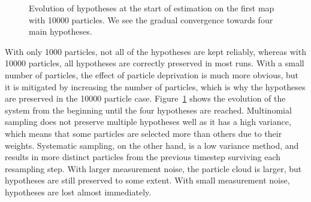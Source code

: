 \documentclass[a4paper,12pt]{article}
\begin{document}
\begin{figure}
  \caption{Evolution of hypotheses at the start of estimation on the first map
    with 10000 particles. We see the gradual convergence towards four main
    hypotheses.}
  \label{fig:hypev}
\end{figure}
With only 1000 particles, not all of the hypotheses are kept reliably, whereas
with 10000 particles, all hypotheses are correctly preserved in most runs. With
a small number of particles, the effect of particle deprivation is much more
obvious, but it is mitigated by increasing the number of particles, which is why
the hypotheses are preserved in the 10000 particle case. Figure~\ref{fig:hypev}
shows the evolution of the system from the beginning until the four hypotheses
are reached. Multinomial sampling does not preserve multiple hypotheses well as
it has a high variance, which means that some particles are selected more than
others due to their weights. Systematic sampling, on the other hand, is a low
variance method, and results in more distinct particles from the previous
timestep surviving each resampling step. With larger measurement noise, the
particle cloud is larger, but hypotheses are still preserved to some
extent. With small measurement noise, hypotheses are lost almost immediately.
\end{document}

